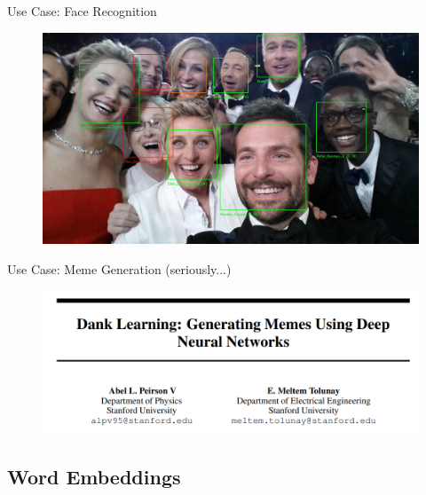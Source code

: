 \begin{frame}{Use Case: Face Recognition}{}
	\begin{figure}
		\centering
		\includegraphics[scale=0.10]{10_deep_learning/02_img/face_recognition}
	\end{figure}
\end{frame}


\begin{frame}{Use Case: Meme Generation (seriously...)}{}
	\begin{figure}
		\centering
		\includegraphics[scale=0.50]{10_deep_learning/02_img/meme_generation}
	\end{figure}
\end{frame}


\subsection{Word Embeddings}

